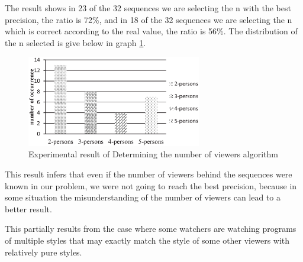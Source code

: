 The result shows in 23 of the 32 sequences we are selecting the n with the best precision, the ratio is 72\%, and in 18 of the 32 sequences we are 
selecting the n which is correct according to the real value, the ratio is 56\%. The distribution of the n selected is give below in graph \ref{fig:distribution2}.

\begin{figure}
\centering
\includegraphics[width=3.0in]{distribution2.eps}
\caption{Experimental result of Determining the number of viewers algorithm}
\label{fig:distribution2}
\end{figure}

This result infers that even if the number of viewers behind the sequences were known in our problem, we were not going to reach the best precision,
because in some situation the misunderstanding of the number of viewers can lead to a better result. 

This partially results from the case where some watchers are watching programs of multiple styles that may exactly match the style of some other
viewers with relatively pure styles. 











